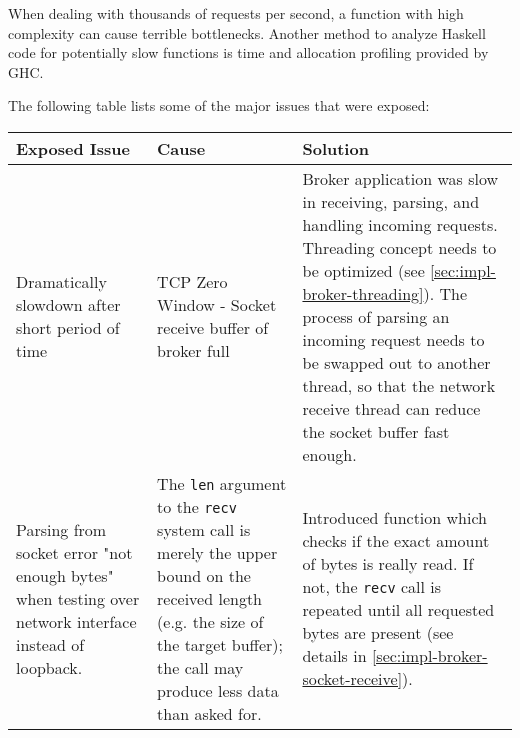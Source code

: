 When dealing with thousands of requests per second, a function with high complexity
can cause terrible bottlenecks. Another method to analyze Haskell code for
potentially slow functions is time and allocation profiling provided by GHC.

The following table lists some of the major issues that were exposed:

\begin{table}[H]
\begin{tabular}{|p{4cm}|p{4.5cm}|p{5cm}|}
\hline
{\bf Exposed Issue}                                                                                  & {\bf Cause}                                                                                                                                                                                                                 & {\bf Solution}                                                                                                                                                                                                                                                                                    \\ \hline
Dramatically slowdown after short period of time                                                       & TCP Zero Window - Socket receive buffer of broker full                                                                                                                                                                      & Broker application was slow in receiving, parsing, and handling incoming requests. Threading concept needs to be optimized (see \ref{sec:impl-broker-threading}). The process of parsing an incoming request needs to be swapped out to another thread, so that the network receive thread can reduce the socket buffer fast enough. \\ \hline
Parsing from socket error "not enough bytes" when testing over network
interface instead of loopback. & The \lstinline{len} argument to the
\lstinline{recv} system call is merely the upper bound on the received length
(e.g. the size of the target buffer); the call may produce less data than asked
for. & Introduced function which checks if the exact amount of bytes is really
read. If not, the \lstinline{recv} call is repeated until all requested bytes are present (see details in \ref{sec:impl-broker-socket-receive}).                                                                                                                                              \\ \hline

\end{tabular}
\end{table}
